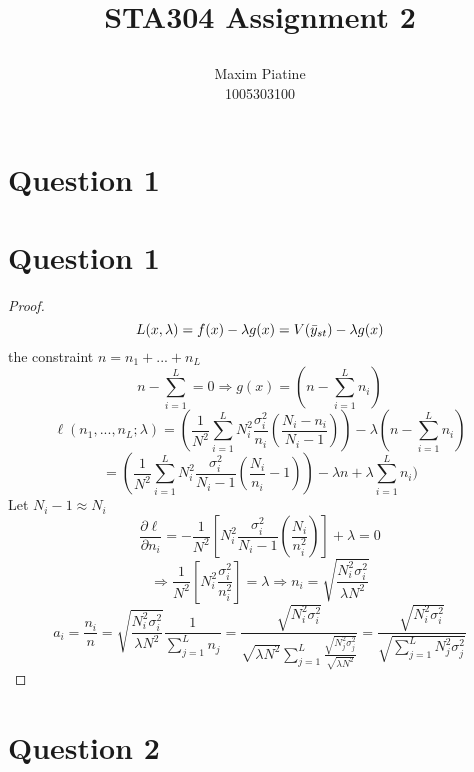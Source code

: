 \documentclass[11pt]{article}
\title{\textbf{STA304 Assignment 2}
\author{Maxim Piatine\\1005303100}}
\date{}
\theoremstyle{claim}
\begin{document}
\maketitle
\section*{Question 1}
\section*{Question 1}
\begin{proof}
\[L(x,\lambda)=f(x)-\lambda g(x)=V(\Bar{y}_{st})-\lambda g(x)\]
the constraint $n=n_1+...+n_L$
\[n-\sum^L_{i=1}=0 \Rightarrow g(x)=(n-\sum^L_{i=1}n_i)\]
\[\ell(n_1,...,n_L;\lambda)=\left(\frac{1}{N^2}\sum^L_{i=1}N_i^2\frac{\sigma^2_i}{n_i}\left(\frac{N_i-n_i}{N_i-1}\right)\right)-\lambda \left(n-\sum^L_{i=1}n_i\right)\]
\[=\left(\frac{1}{N^2}\sum^L_{i=1}N_i^2\frac{\sigma^2_i}{N_i-1}\left(\frac{N_i}{n_i}-1\right)\right)-\lambda n+\lambda\sum^L_{i=1}n_i)\]
Let $N_i-1\approx N_i$
\[\frac{\partial\ell}{\partial n_i}=-\frac{1}{N^2}\left[
N_i^2\frac{\sigma^2_i}{N_i-1}\left(\frac{N_i}{n_i^2}\right)
\right] + \lambda=0\]
\[\Rightarrow \frac{1}{N^2}\left[
N_i^2\frac{\sigma^2_i}{n_i^2}
\right] =\lambda \Rightarrow n_i=\sqrt{\frac{N_i^2\sigma^2_i}{\lambda N^2}}\]
\[a_i=\frac{n_i}{n}=\sqrt{\frac{N_i^2\sigma^2_i}{\lambda N^2}}\frac{1}{\sum^L_{j=1}n_j}=\frac{\sqrt{N_i^2\sigma^2_i}}{\sqrt{\lambda N^2}\sum^L_{j=1}\frac{\sqrt{N_j^2 \sigma^2_j}}{\sqrt{\lambda N^2}}}=\frac{\sqrt{N_i^2\sigma^2_i}}{\sqrt{\sum^L_{j=1}N_j^2\sigma^2_j}}\]

\end{proof}


\newpage
\section*{Question 2}



\newpage
\end{document}
